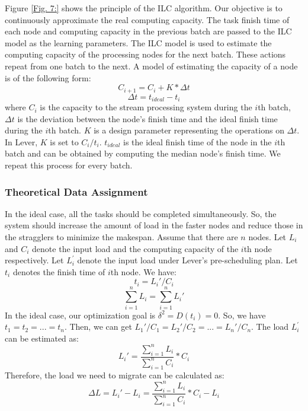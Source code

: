 Figure \ref{Fig. 7:} shows the principle of the ILC algorithm. Our objective
is to continuously approximate the real computing capacity. The task finish
time of each node and computing capacity in the previous batch are passed to the ILC
model as the learning parameters. The ILC model is used to estimate the
computing capacity of the processing nodes for the next batch. These actions
repeat from one batch to the next. A model of estimating the capacity of a
node is of the following form:
  \begin{equation}
  C_{i+1} = C_i + K*\Delta t
  \end{equation}
   \begin{equation}
  \Delta t = t_{ideal} - t_{i}
  \end{equation}
where $C_i$ is the capacity to the stream processing system during the
$i$th batch, $\Delta t$ is the deviation between the node's finish time and the ideal
finish time during the $i$th batch. $K$ is a design parameter representing
the operations on $\Delta t$. In Lever, $K$ is set to $C_i/t_i$. $t_{ideal}$ is the
ideal finish time of the node in the $i$th batch and can be obtained by computing the
median node's finish time. We repeat this process for every batch.

\subsubsection{Theoretical Data Assignment}

In the ideal case, all the tasks should be completed simultaneously. So, the system
should increase the amount of load in the faster nodes and reduce those in
the stragglers to minimize the makespan. Assume that there are $n$ nodes. Let
\emph{$L_i$} and \emph{$C_i$} denote the input load and the computing capacity
of the $i$th node respectively. Let \emph{$L_i^\prime$} denote the input load
under Lever's pre-scheduling plan. Let $t_i$ denotes the finish time of $i$th node. We have:
  \begin{equation}
  t_i = L_i\prime / C_i
  \end{equation}
  \begin{equation}
  \sum_{i=1}^n L_i = \sum_{i=1}^n L_i\prime
  \end{equation}
In the ideal case, our optimization goal is $\delta^{2}=D(t_i)=0$. So, we have
$t_1=t_2=...=t_n$. Then, we can get
$L_1\prime/C_1=L_2\prime/C_2=...=L_n\prime/C_n$. The load \emph{$L_i^\prime$}
can be estimated  as:
  \begin{equation}
  L_i\prime =  \frac{\sum_{i=1}^n L_i}{\sum_{i=1}^n C_i}*C_i
  \end{equation}
Therefore, the load we need to migrate can be calculated as:
  \begin{equation}
  \Delta L = L_i\prime - L_i = \frac{\sum_{i=1}^n L_i}{\sum_{i=1}^n C_i}*C_i - L_i
  \end{equation}

